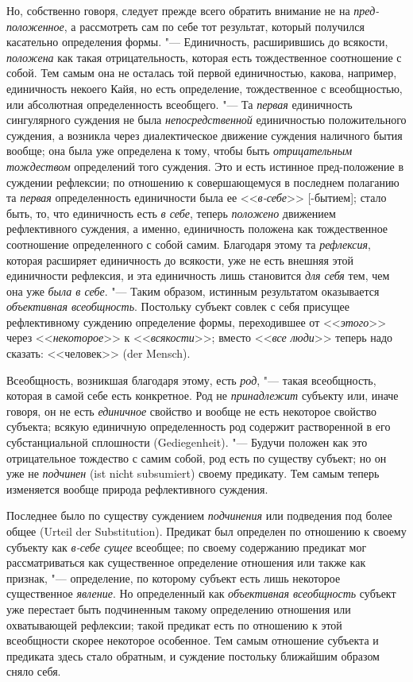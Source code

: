 Но, собственно говоря, следует прежде всего обратить внимание
не на {\em пред-положенное},
а рассмотреть сам по себе тот результат, который получился
касательно определения формы. "--- Единичность, расширившись до
всякости, {\em положена}
как такая отрицательность, которая есть тождественное
соотношение с собой. Тем самым она не осталась той первой единичностью,
какова, например, единичность некоего Кайя, но есть определение,
тождественное с всеобщностью, или абсолютная определенность всеобщего. "---
Та {\em первая}
единичность сингулярного суждения не была
{\em непосредственной}
единичностью положительного суждения, а возникла через
диалектическое движение суждения наличного бытия вообще; она была уже
определена к тому, чтобы быть
{\em отрицательным тождеством}
определений того суждения. Это и есть истинное пред-положение
в суждении рефлексии; по отношению к совершающемуся в последнем полаганию
та {\em первая}
определенность единичности была ее
<<{\em в-себе}>> [-бытием];
стало быть, то, что единичность есть
{\em в себе}, теперь
{\em положено} движением
рефлективного суждения, а именно, единичность положена как тождественное
соотношение определенного с собой самим. Благодаря этому та
{\em рефлексия}, которая
расширяет единичность до всякости, уже не есть внешняя этой единичности
рефлексия, и эта единичность лишь становится
{\em для себя} тем, чем
она уже {\em была в себе}. "---
Таким образом, истинным результатом оказывается
{\em объективная всеобщность}.
Постольку субъект совлек с себя присущее рефлективному
суждению определение формы, переходившее от
<<{\em этого}>> через
<<{\em некоторое}>> к
<<{\em всякости}>>; вместо
<<{\em все люди}>> теперь
надо сказать: <<человек>> (der Mensch).

Всеобщность, возникшая благодаря этому, есть
{\em род}, "--- такая
всеобщность, которая в самой себе есть конкретное. Род не
{\em принадлежит}
субъекту или, иначе говоря, он не есть
{\em единичное} свойство
и вообще не есть некоторое свойство субъекта; всякую единичную
определенность род содержит растворенной в его субстанциальной сплошности
(Gediegenheit). "--- Будучи положен как это отрицательное
тождество с самим собой, род есть по существу субъект; но он уже не
{\em подчинен} (ist nicht subsumiert)
своему предикату. Тем самым теперь изменяется вообще природа
рефлективного суждения.

Последнее было по существу суждением
{\em подчинения} или
подведения под более общее (Urteil der Substitution).
Предикат был определен по отношению к своему субъекту как
{\em в-себе сущее}
всеобщее; по своему содержанию предикат мог рассматриваться
как существенное определение отношения или также как признак, "---
определение, по которому субъект есть лишь некоторое
существенное {\em явление}.
Но определенный как
{\em объективная всеобщность}
субъект уже перестает быть подчиненным такому определению
отношения или охватывающей рефлексии; такой предикат есть по отношению к
этой всеобщности скорее некоторое особенное. Тем самым отношение субъекта и
предиката здесь стало обратным, и суждение постольку ближайшим образом
сняло себя.

